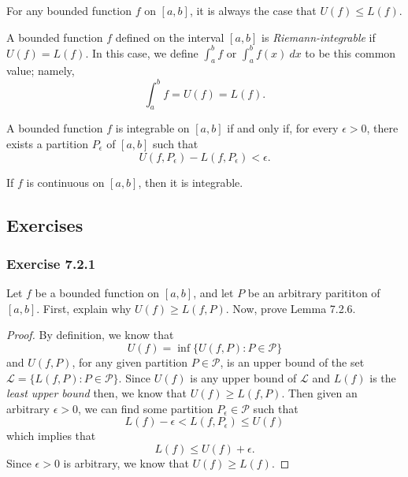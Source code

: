 \begin{tcolorbox}
\begin{lem}
	For any bounded function \( f  \) on \( [a,b]  \), it is always the case that \( U(f) \leq L(f) \).
\end{lem}
\end{tcolorbox}


\begin{tcolorbox}
	\begin{defn}
	A bounded function \( f  \) defined on the interval \( [a,b] \) is \textit{Riemann-integrable} if \( U(f) = L(f) \). In this case, we define \( \int_{ a }^{ b } f   \) or \( \int_{ a }^{ b } f(x) \ dx \) to be this common value; namely, 
	\[  \int_{ a }^{ b } f  = U(f) = L(f). \]
	\end{defn}
\end{tcolorbox}


\begin{tcolorbox}
	\begin{thm}
		A bounded function \(  f \) is integrable on \( [a,b]  \) if and only if, for every \( \epsilon > 0  \), there exists a partition \( P_{\epsilon } \) of \( [a,b] \) such that 
		\[  U(f, P_{\epsilon }) - L(f, P_{\epsilon }) < \epsilon. \]
	\end{thm}
\end{tcolorbox}


\begin{tcolorbox}
\begin{thm}
	If \( f  \) is continuous on \( [a,b] \), then it is integrable.
\end{thm}
\end{tcolorbox}




\subsection{Exercises}

\subsubsection{Exercise 7.2.1} Let \( f  \) be a bounded function on \( [a,b]  \), and let \( P  \) be an arbitrary parititon of \(  [a,b]  \). First, explain why \( U(f) \geq L(f,P)  \). Now, prove Lemma 7.2.6.
\begin{proof}
By definition, we know that 
\[  U(f) = \inf \{ U(f,P) : P \in \mathcal{P} \}  \] and \( U(f,P)   \), for any given partition \( P \in \mathcal{P} \), is an upper bound of the set \( \mathcal {L} = \{ L(f,P) 
: P \in \mathcal{P}\}  \). Since \( U(f)  \) is any upper bound of \( \mathcal{L} \) and \( L(f)  \) is the \textit{least upper bound} then, we know that \( U(f) \geq L(f,P) \). Then given an arbitrary \( \epsilon > 0  \), we can find some partition \( P_{\epsilon } \in \mathcal{P} \) such that 
\[  L(f) - \epsilon < L(f, P_{\epsilon }) \leq U(f)  \]
which implies that 
\[  L(f) \leq U(f) + \epsilon. \]
Since \( \epsilon > 0  \) is arbitrary, we know that \( U(f) \geq L(f) \).
\end{proof}


